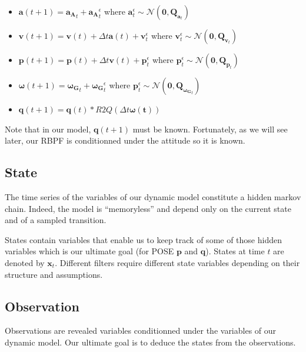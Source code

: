 \documentclass[]{article}
\providecommand{\tightlist}{%
  \setlength{\itemsep}{0pt}\setlength{\parskip}{0pt}}
\begin{document}
\begin{itemize}
\tightlist
\item
  \(\mathbf{a}(t+1) = \mathbf{a_A}_t + \mathbf{a_A}^\epsilon_t\) where
  \(\mathbf{a}^\epsilon_t \sim \mathcal{N}(\mathbf{0}, \mathbf{Q}_{\mathbf{a}_t })\)
\item
  \(\mathbf{v}(t+1) = \mathbf{v}(t) + \Delta t \mathbf{a}(t) + \mathbf{v}^\epsilon_t\)
  where
  \(\mathbf{v}^\epsilon_t \sim \mathcal{N}(\mathbf{0}, \mathbf{Q}_{\mathbf{v}_t })\)
\item
  \(\mathbf{p}(t+1) = \mathbf{p}(t) + \Delta t \mathbf{v}(t) + \mathbf{p}^\epsilon_t\)
  where
  \(\mathbf{p}^\epsilon_t \sim \mathcal{N}(\mathbf{0}, \mathbf{Q}_{\mathbf{p}_t })\)
\item
  \(\boldsymbol{\omega}(t+1) = \mathbf{\boldsymbol{\omega}_G}_t + \mathbf{\boldsymbol{\omega}_G}^\epsilon_t\)
  where
  \(\mathbf{p}^\epsilon_t \sim \mathcal{N}(\mathbf{0}, \mathbf{Q}_{\mathbf{\boldsymbol{\omega}_G}_t })\)
\item
  \(\mathbf{q}(t+1) = \mathbf{q}(t)*R2Q(\Delta t \boldsymbol{ \omega(t) })\)
\end{itemize}

Note that in our model, \(\mathbf{q}(t+1)\) must be known. Fortunately,
as we will see later, our RBPF is conditionned under the attitude so it
is known.

\subsection{State}\label{state}

The time series of the variables of our dynamic model constitute a
hidden markov chain. Indeed, the model is ``memoryless'' and depend only
on the current state and of a sampled transition.

States contain variables that enable us to keep track of some of those
hidden variables which is our ultimate goal (for POSE \(\mathbf{p}\) and
\(\mathbf{q}\)). States at time \(t\) are denoted by \(\mathbf{x}_t\).
Different filters require different state variables depending on their
structure and assumptions.

\subsection{Observation}\label{observation}

Observations are revealed variables conditionned under the variables of
our dynamic model. Our ultimate goal is to deduce the states from the
observations.
\end{document}
